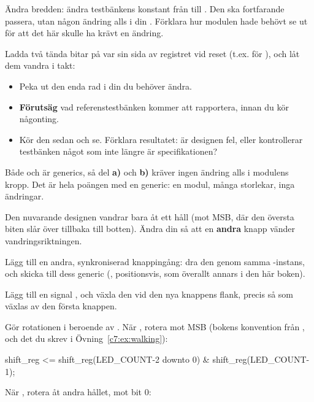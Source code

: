  Ändra bredden: ändra testbänkens konstant  från  till .
Den ska fortfarande passera, utan någon ändring alls i din . Förklara hur
modulen hade behövt se ut för att det här skulle ha krävt en ändring.

 Ladda två tända bitar på var sin sida av registret vid reset (t.ex.  för
), och låt dem vandra i takt:
\begin{itemize}
  \item Peka ut den enda rad i din  du behöver ändra.
  \item \textbf{Förutsäg} vad referenstestbänken kommer att rapportera, innan du kör någonting.
  \item Kör den sedan och se. Förklara resultatet: är designen fel, eller kontrollerar testbänken
    något som inte längre är specifikationen?
\end{itemize}

\note[Tips]Både  och  är generics, så del \textbf{a)} och
\textbf{b)} kräver ingen ändring alls i modulens kropp. Det är hela poängen med en generic: en
modul, många storlekar, inga ändringar.

\label{c7:ex:direction}
Den nuvarande designen vandrar bara åt ett håll (mot MSB, där den översta biten slår över tillbaka
till botten). Ändra din  så att en \textbf{andra} knapp vänder
vandringsriktningen.

 Lägg till en andra, synkroniserad knappingång: dra den genom samma
-instans, och skicka  till dess generic 
(, positionsvis, som överallt annars i den här boken).

 Lägg till en signal , och växla den vid den nya knappens flank, precis så
som  växlas av den första knappen.

 Gör rotationen i  beroende av . När
, rotera mot MSB (bokens konvention från , och det du
skrev i Övning~\ref{c7:ex:walking}):

\begin{vhdlcode}
shift_reg <= shift_reg(LED_COUNT-2 downto 0) & shift_reg(LED_COUNT-1);
\end{vhdlcode}

När , rotera åt andra hållet, mot bit 0:

